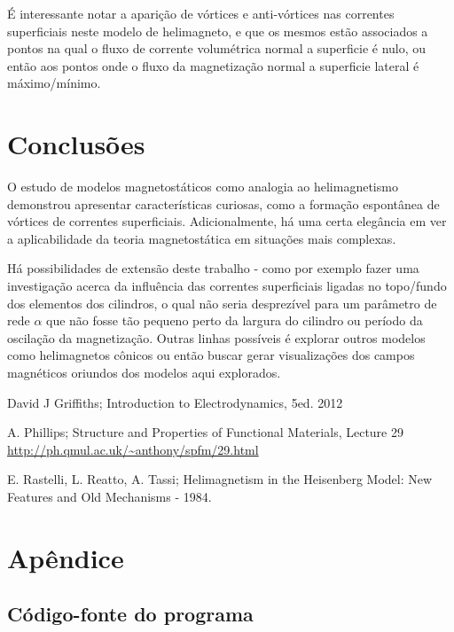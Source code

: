 \documentclass[a4paper, 12pt, twocolumn]{article}
\begin{document}
É interessante notar a aparição de vórtices e anti-vórtices nas correntes superficiais neste modelo de helimagneto, e que os mesmos estão associados a pontos na qual o fluxo de corrente volumétrica normal a superficie é nulo, ou então aos pontos onde o fluxo da magnetização normal a superficie lateral é máximo/mínimo.

\section{Conclusões}

O estudo de modelos magnetostáticos como analogia ao helimagnetismo demonstrou apresentar características curiosas, como a formação espontânea de vórtices de correntes superficiais. Adicionalmente, há uma certa elegância em ver a aplicabilidade da teoria magnetostática em situações mais complexas.

Há possibilidades de extensão deste trabalho - como por exemplo fazer uma investigação acerca da influência das correntes superficiais ligadas no topo/fundo dos elementos dos cilindros, o qual não seria desprezível para um parâmetro de rede $\alpha$ que não fosse tão pequeno perto da largura do cilindro ou período da oscilação da magnetização. Outras linhas possíveis é explorar outros modelos como helimagnetos cônicos ou então buscar gerar visualizações dos campos magnéticos oriundos dos modelos aqui explorados.

\begin{thebibliography}{9}

David J Griffiths; Introduction to Electrodynamics, 5ed.  2012

A. Phillips; Structure and Properties of Functional Materials, Lecture 29
\url{http://ph.qmul.ac.uk/~anthony/spfm/29.html}

E. Rastelli, L. Reatto, A. Tassi; Helimagnetism in the Heisenberg Model: New Features and Old Mechanisms - 1984.

\end{thebibliography}

\onecolumn

\section{Apêndice}

\subsection{Código-fonte do programa}
\end{document}
